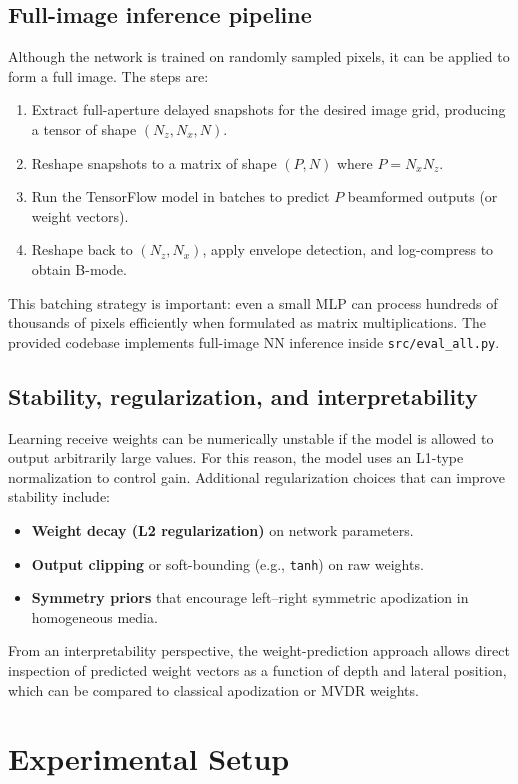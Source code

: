 \documentclass[conference]{IEEEtran}
\begin{document}
\subsection{Full-image inference pipeline}
Although the network is trained on randomly sampled pixels, it can be applied to form a full image. The steps are:
\begin{enumerate}
    \item Extract full-aperture delayed snapshots for the desired image grid, producing a tensor of shape $(N_z,N_x,N)$.
    \item Reshape snapshots to a matrix of shape $(P,N)$ where $P=N_xN_z$.
    \item Run the TensorFlow model in batches to predict $P$ beamformed outputs (or weight vectors).
    \item Reshape back to $(N_z,N_x)$, apply envelope detection, and log-compress to obtain B-mode.
\end{enumerate}
This batching strategy is important: even a small MLP can process hundreds of thousands of pixels efficiently when formulated as matrix multiplications. The provided codebase implements full-image NN inference inside \texttt{src/eval\_all.py}.

\subsection{Stability, regularization, and interpretability}
Learning receive weights can be numerically unstable if the model is allowed to output arbitrarily large values. For this reason, the model uses an L1-type normalization to control gain. Additional regularization choices that can improve stability include:
\begin{itemize}
    \item \textbf{Weight decay (L2 regularization)} on network parameters.
    \item \textbf{Output clipping} or soft-bounding (e.g., \texttt{tanh}) on raw weights.
    \item \textbf{Symmetry priors} that encourage left--right symmetric apodization in homogeneous media.
\end{itemize}
From an interpretability perspective, the weight-prediction approach allows direct inspection of predicted weight vectors as a function of depth and lateral position, which can be compared to classical apodization or MVDR weights.

\section{Experimental Setup}
\end{document}
